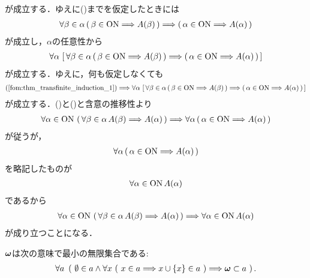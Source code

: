 \begin{prf}
		が成立する．ゆえに()までを仮定したときには
		\begin{align}
			\forall \beta \in \alpha\, (\, \beta \in \mathrm{ON} \Longrightarrow A(\beta)\, )
			\Longrightarrow (\, \alpha \in \mathrm{ON} \Longrightarrow A(\alpha)\, )
		\end{align}
		が成立し，$\alpha$の任意性から
		\begin{align}
			\forall \alpha\, \left[\, \forall \beta \in \alpha\, (\, \beta \in \mathrm{ON} \Longrightarrow A(\beta)\, )
			\Longrightarrow (\, \alpha \in \mathrm{ON} \Longrightarrow A(\alpha)\, )\, \right]
		\end{align}
		が成立する．ゆえに，何も仮定しなくても
		\begin{align}
			(\refeq{fom:thm_transfinite_induction_1}) \Longrightarrow
			\forall \alpha\, \left[\, \forall \beta \in \alpha\, (\, \beta \in \ON \Longrightarrow A(\beta)\, )
			\Longrightarrow (\, \alpha \in \ON \Longrightarrow A(\alpha)\, )\, \right]
			\label{fom:thm_transfinite_induction_3}
		\end{align}
		が成立する．()と()と含意の推移性より
		\begin{align}
			\forall \alpha \in \mathrm{ON}\, \left(\, \forall \beta \in \alpha\, A(\beta) \Longrightarrow A(\alpha)\, \right)
			\Longrightarrow \forall \alpha\, (\, \alpha \in \mathrm{ON} \Longrightarrow A(\alpha)\, )
		\end{align}
		が従うが，
		\begin{align}
			\forall \alpha\, (\, \alpha \in \mathrm{ON} \Longrightarrow A(\alpha)\, )
		\end{align}
		を略記したものが
		\begin{align}
			\forall \alpha \in \mathrm{ON}\, A(\alpha)
		\end{align}
		であるから
		\begin{align}
			\forall \alpha \in \mathrm{ON}\, \left(\, \forall \beta \in \alpha\, A(\beta) \Longrightarrow A(\alpha)\, \right)
			\Longrightarrow \forall \alpha \in \mathrm{ON}\, A(\alpha)
		\end{align}
		が成り立つことになる．
		\QED
	\end{prf}
	
	\begin{screen}
		\begin{thm}[数学的帰納法の原理]
		\label{thm:the_principle_of_mathematical_induction}
			${\boldsymbol \omega}$は次の意味で最小の無限集合である:
			\begin{align}
				\forall a\ \left(\ \emptyset \in a \wedge \forall x\ 
				(\ x \in a \Longrightarrow x \cup \{x\} \in a\ ) 
				\Longrightarrow \omg \subset a\ \right).
			\end{align}
		\end{thm}
	\end{screen}
	
